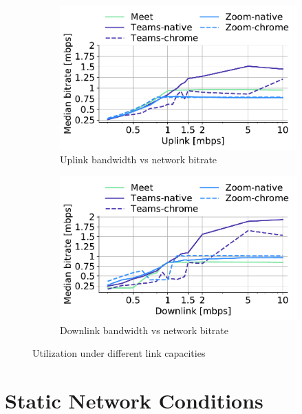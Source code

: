 \begin{figure}[]
\vspace{-7em}
\begin{subfigure}[t]{0.45\textwidth}
    \centering
    \includegraphics[width=\textwidth,keepaspectratio]{figures/static/uplink.pdf}
    \caption{Uplink bandwidth vs network bitrate}
	\label{subfig:uplink_bitrate}
\end{subfigure}
\begin{subfigure}[t]{0.45\textwidth}
\centering
    \includegraphics[width=\textwidth,keepaspectratio]{figures/static/downlink.pdf}
    \caption{Downlink bandwidth vs network bitrate}
	\label{subfig:downlink_bitrate}
\end{subfigure} 
\caption{Utilization under different link capacities}
\label{fig:static}
\end{figure}

\section{Static Network Conditions}\label{sec:static}

